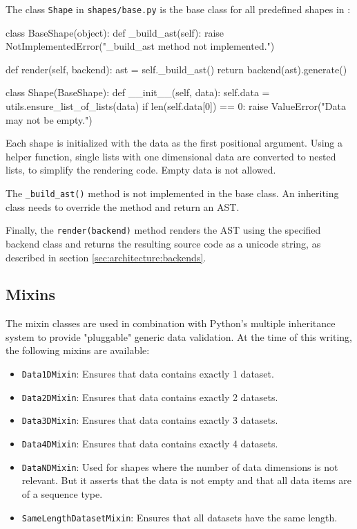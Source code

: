 The class \texttt{Shape} in \texttt{shapes/base.py} is the base class for all
predefined shapes in \tangible{}:

\vspace{.5\baselineskip}

\begin{pythoncode}
class BaseShape(object):
    def _build_ast(self):
        raise NotImplementedError("_build_ast method not implemented.")

    def render(self, backend):
        ast = self._build_ast()
        return backend(ast).generate()
    
class Shape(BaseShape):
    def __init__(self, data):
        self.data = utils.ensure_list_of_lists(data)
        if len(self.data[0]) == 0:
            raise ValueError("Data may not be empty.")
\end{pythoncode}

\noindent Each shape is initialized with the data as the first positional
argument. Using a helper function, single lists with one dimensional data are
converted to nested lists, to simplify the rendering code. Empty data is not
allowed.

The \texttt{\_build\_ast()} method is not implemented in the base class. An
inheriting class needs to override the method and return an AST.

Finally, the \texttt{render(backend)} method renders the AST using the specified
backend class and returns the resulting source code as a unicode string, as
described in section \ref{sec:architecture:backends}.

\subsection{Mixins}

The mixin classes are used in combination with Python's multiple inheritance
system to provide "pluggable" generic data validation. At the time of this
writing, the following mixins are available:

\begin{itemize}
	\item \texttt{Data1DMixin}: Ensures that data contains exactly 1 dataset.
	\item \texttt{Data2DMixin}: Ensures that data contains exactly 2 datasets.
	\item \texttt{Data3DMixin}: Ensures that data contains exactly 3 datasets.
	\item \texttt{Data4DMixin}: Ensures that data contains exactly 4 datasets.
	\item \texttt{DataNDMixin}: Used for shapes where the number of data
		dimensions is not relevant. But it asserts that the data is not empty and
		that all data items are of a sequence type.
	\item \texttt{SameLengthDatasetMixin}: Ensures that all datasets have the same
		length.
\end{itemize}


